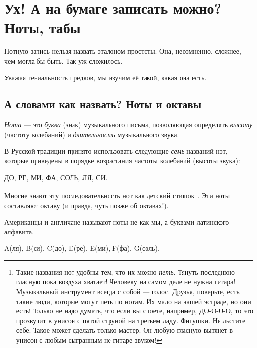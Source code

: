 \chapter{Ух! А на бумаге записать можно? Ноты, табы}
\label{ch:encoding}

Нотную запись нельзя назвать эталоном простоты. Она, несомненно, сложнее, чем могла бы быть. Так уж сложилось.

Уважая гениальность предков, мы изучим её такой, какая она есть.


\section{А словами как назвать? Ноты и октавы}
\label{sec:encoding:notes}

\emph{Нота} --- это \emph{буква} (знак) музыкального письма, позволяющая определить \emph{высоту} (частоту колебаний) и \emph{длительность} музыкального звука. 

В Русской традиции принято использовать следующие \emph{семь} названий нот, которые приведены в порядке возрастания частоты колебаний (высоты звука): 
\begin{center}
    ДО, РЕ, МИ, ФА, СОЛЬ, ЛЯ, СИ. 
\end{center}

Многие знают эту последовательность нот как детский стишок\footnote{Такие названия нот удобны тем, что их можно \emph{петь}. Тянуть последнюю гласную пока воздуха хватает! Человеку на самом деле не нужна гитара! Музыкальный инструмент всегда с собой --- голос. Друзья, поверьте, есть такие люди, которые могут петь по нотам. Их мало на нашей эстраде, но они есть! Только не надо думать, что если вы споете, например, ДО-О-О-О, то это прозвучит в унисон с пятой струной на третьем ладу. Фигушки. Не льстите себе. Такое может сделать только мастер. Он любую гласную вытянет в унисон с любым сыгранным не гитаре звуком!}. Эти ноты составляют октаву (и правда, чуть позже об октавах!).

Американцы и англичане называют ноты не как мы, а буквами латинского алфавита: 
\begin{center}
    A(ля), B(си), C(до), D(ре), E(ми), F(фа), G(соль).
\end{center}


